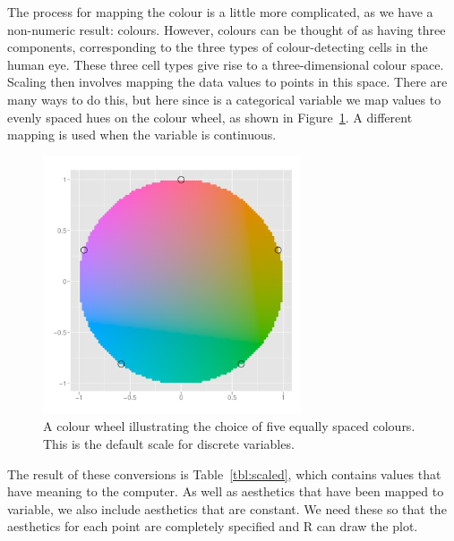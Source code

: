 The process for mapping the colour is a little more complicated, as we have a non-numeric result: colours. However, colours can be thought of as having three components, corresponding to the three types of colour-detecting cells in the human eye. These three cell types give rise to a three-dimensional colour space. Scaling then involves mapping the data values to points in this space. There are many ways to do this, but here since  is a categorical variable we map values to evenly spaced hues on the colour wheel, as shown in Figure~\ref{fig:colour-wheel}. A different mapping is used when the variable is continuous.

\begin{figure}[htbp]
  \centering
    \includegraphics[width=3in]{colour-wheel}
  \caption{A colour wheel illustrating the choice of five equally spaced colours.   This is the default scale for discrete variables.}
  \label{fig:colour-wheel}
\end{figure}

The result of these conversions is Table~\ref{tbl:scaled}, which contains values that have meaning to the computer. As well as aesthetics that have been mapped to variable, we also include aesthetics that are constant. We need these so that the aesthetics for each point are completely specified and R can draw the plot.




